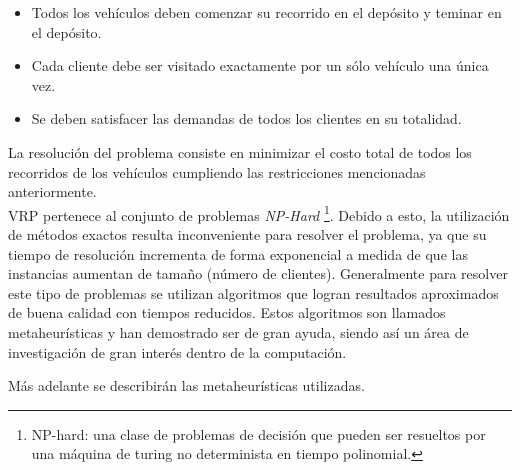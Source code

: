 \begin{itemize}

	\item Todos los vehículos deben comenzar su recorrido en el depósito y teminar en el depósito.
	\item Cada cliente debe ser visitado exactamente por un sólo vehículo una única vez.
	\item Se deben satisfacer las demandas de todos los clientes en su totalidad.
	
\end{itemize}

La resolución del problema consiste en minimizar el costo total de todos los recorridos de los vehículos cum\-plien\-do las restricciones mencionadas anteriormente. \\


VRP pertenece al conjunto de problemas \textit{NP-Hard
}\footnote{NP-hard: una clase de problemas de decisión que pueden ser resueltos por una máquina de turing no determinista en tiempo polinomial.}. Debido a esto, la utilización de métodos exactos resulta inconveniente para resolver el problema, ya que su tiempo de resolución incrementa de forma exponencial a medida de que las instancias aumentan de tamaño (número de clientes). Generalmente para resolver este tipo de problemas se utilizan algoritmos que logran resultados aproximados de buena calidad con tiempos reducidos. Estos algoritmos son llamados metaheurísticas y han demostrado ser de gran ayuda, siendo así un área de investigación de gran interés dentro de la computación.

Más adelante se describirán las metaheurísticas utilizadas.

